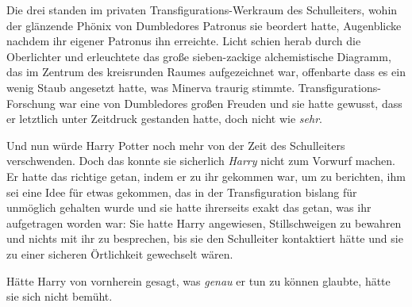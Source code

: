 Die drei standen im privaten Transfigurations-Werkraum des Schulleiters, wohin der glänzende Phönix von Dumbledores Patronus sie beordert hatte, Augenblicke nachdem ihr eigener Patronus ihn erreichte. Licht schien herab durch die Oberlichter und erleuchtete das große sieben-zackige alchemistische Diagramm, das im Zentrum des kreisrunden Raumes aufgezeichnet war, offenbarte dass es ein wenig Staub angesetzt hatte, was Minerva traurig stimmte. Transfigurations-Forschung war eine von Dumbledores großen Freuden und sie hatte gewusst, dass er letztlich unter Zeitdruck gestanden hatte, doch nicht wie \emph{sehr}.

Und nun würde Harry Potter noch mehr von der Zeit des Schulleiters verschwenden. Doch das konnte sie sicherlich \emph{Harry} nicht zum Vorwurf machen. Er hatte das richtige getan, indem er zu ihr gekommen war, um zu berichten, ihm sei eine Idee für etwas gekommen, das in der Transfiguration bislang für unmöglich gehalten wurde und sie hatte ihrerseits exakt das getan, was ihr aufgetragen worden war: Sie hatte Harry angewiesen, Stillschweigen zu bewahren und nichts mit ihr zu besprechen, bis sie den Schulleiter kontaktiert hätte und sie zu einer sicheren Örtlichkeit gewechselt wären.

Hätte Harry von vornherein gesagt, was \emph{genau} er tun zu können glaubte, hätte sie sich nicht bemüht.

